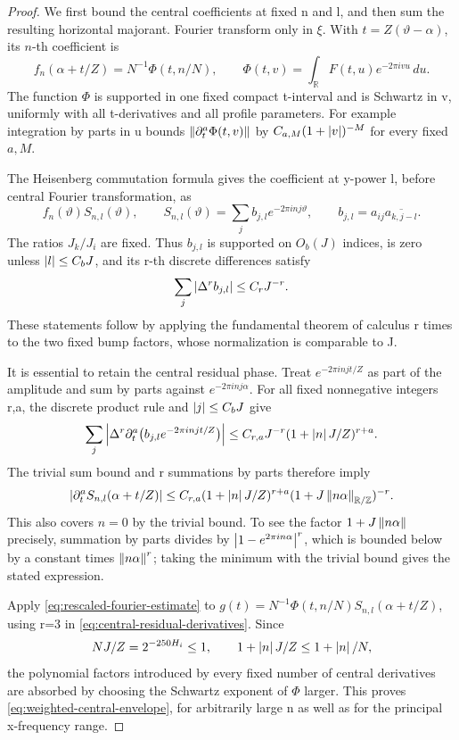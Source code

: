 \begin{proof}
We first bound the central coefficients at fixed n and l, and then sum the
resulting horizontal majorant.
Fourier transform only in \(\xi\).  With \(t=Z(\vartheta-\alpha)\), its
\(n\)-th coefficient is
\[
 f_n(\alpha+t/Z)=N^{-1}\Phi(t,n/N),\qquad
 \Phi(t,v)=\int_{\mathbb R}F(t,u)e^{-2\pi ivu}\,du.
\]
The function \(\Phi\) is supported in one fixed compact t-interval and is
Schwartz in v, uniformly with all t-derivatives and all profile parameters.
For example integration by parts in u bounds
\(\left\lVert\partial_t^a\Phi(t,v)\right\rVert\) by \(C_{a,M}(1+\left\lvert v\right\rvert)^{-M}\) for every
fixed \(a,M\).

The Heisenberg commutation formula gives the coefficient at y-power l, before
central Fourier transformation, as
\[
 f_n(\vartheta)S_{n,l}(\vartheta),\qquad
 S_{n,l}(\vartheta)=\sum_j b_{j,l}e^{-2\pi i n j\vartheta},\qquad
 b_{j,l}=a_{ij}\overline{a_{k,j-l}}.
\]
The ratios \(J_k/J_i\) are fixed.  Thus \(b_{j,l}\) is supported on
\(O_b(J)\) indices, is zero unless \(\left\lvert l\right\rvert\leq C_bJ\), and its r-th discrete
differences satisfy
\[
 \sum_j\left\lvert\Delta^r b_{j,l}\right\rvert\leq C_rJ^{-r}.
\]
These statements follow by applying the fundamental theorem of calculus r
times to the two fixed bump factors, whose normalization is comparable to J.

It is essential to retain the central residual phase.  Treat
\(e^{-2\pi i n jt/Z}\) as part of the amplitude and sum by parts against
\(e^{-2\pi i n j\alpha}\).  For all fixed nonnegative integers r,a, the
discrete product rule and \(\left\lvert j\right\rvert\leq C_bJ\) give
\[
 \sum_j\left|\Delta^r\partial_t^a
              \bigl(b_{j,l}e^{-2\pi i n jt/Z}\bigr)\right|
 \leq C_{r,a}J^{-r}(1+\left\lvert n\right\rvert J/Z)^{r+a}.
\]
The trivial sum bound and r summations by parts therefore imply
\begin{equation}
\label{eq:central-residual-derivatives}
 \left|\partial_t^aS_{n,l}(\alpha+t/Z)\right|
 \leq C_{r,a}(1+\left\lvert n\right\rvert J/Z)^{r+a}
          (1+J\left\lVert n\alpha\right\rVert_{\mathbb R/\mathbb Z})^{-r}.
\end{equation}
This also covers \(n=0\) by the trivial bound.  To see the factor
\(1+J\left\lVert n\alpha\right\rVert\) precisely, summation by parts divides by
\(\left\lvert1-e^{2\pi in\alpha}\right\rvert^r\), which is bounded below by a constant times
\(\left\lVert n\alpha\right\rVert^r\); taking the minimum with the trivial bound gives the
stated expression.

Apply \eqref{eq:rescaled-fourier-estimate} to
\(g(t)=N^{-1}\Phi(t,n/N)S_{n,l}(\alpha+t/Z)\), using r=3 in
\eqref{eq:central-residual-derivatives}.  Since
\[
 NJ/Z=2^{-250H_i}\leq1,\qquad
 1+\left\lvert n\right\rvert J/Z\leq1+\left\lvert n\right\rvert/N,
\]
the polynomial factors introduced by every fixed number of central derivatives
are absorbed by choosing the Schwartz exponent of \(\Phi\) larger.  This proves
\eqref{eq:weighted-central-envelope}, for arbitrarily large n as well as for
the principal x-frequency range.


\end{proof}
